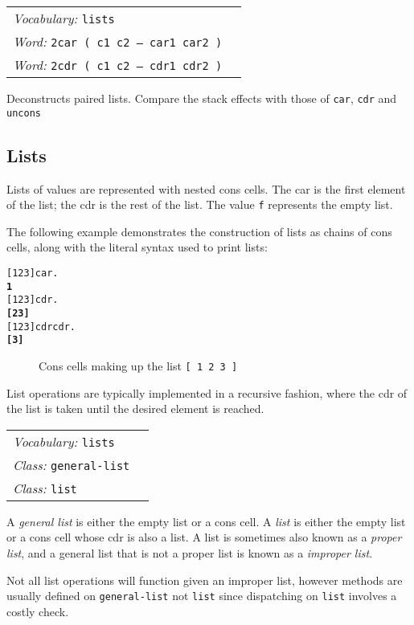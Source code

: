 \documentclass{book}
\newcommand{\vocabulary}[1]{\emph{Vocabulary:} \texttt{#1}&\\}
\newcommand{\ordinaryword}[2]{\index{\texttt{#1}}\emph{Word:} \texttt{#2}&\\}
\newcommand{\classword}[1]{\index{\texttt{#1}}\emph{Class:} \texttt{#1}&\\}
\newcommand{\wordtable}[1]{


\begin{tabularx}{12cm}{lX}
\hline
#1
\hline
\end{tabularx}

}
\begin{document}
\wordtable{
\vocabulary{lists}
\ordinaryword{2car}{2car ( c1 c2 -- car1 car2 )}
\ordinaryword{2cdr}{2cdr ( c1 c2 -- cdr1 cdr2 )}
}
Deconstructs paired lists. Compare the stack effects with those of \verb|car|, \verb|cdr| and \verb|uncons|

\subsection{Lists}\label{lists}

\listglos
{}

Lists of values are represented with nested cons cells. The car is the first element of the list; the cdr is the rest of the list. The value \texttt{f} represents the empty list.

The following example demonstrates the construction of lists as chains of cons cells, along with the literal syntax used to print lists:
\begin{alltt}
  {[} 1 2 3 {]} car .
\textbf{1}
  {[} 1 2 3 {]} cdr .
\textbf{{[} 2 3 {]}}
  {[} 1 2 3 {]} cdr cdr .
\textbf{{[} 3 {]}}
\end{alltt}

\begin{figure}
\caption{Cons cells making up the list \texttt{[ 1 2 3 ]}}
\begin{center}
\end{center}
\end{figure}

List operations are typically implemented in a recursive fashion, where the cdr of the list is taken until the desired element is reached.

\wordtable{
\vocabulary{lists}
\classword{general-list}
\classword{list}
}
A \emph{general list} is either the empty list or a cons cell. A \emph{list} is either the empty list or a cons cell whose cdr is also a list. A list is sometimes also known as a \emph{proper list}, and a general list that is not a proper list is known as a \emph{improper list}.

Not all list operations will function given an improper list,
however methods are usually defined on \texttt{general-list} not \texttt{list} since dispatching on \texttt{list} involves a costly check.
\end{document}
